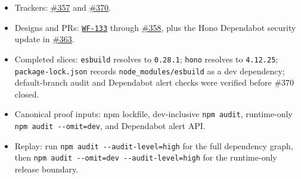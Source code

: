 \begin{itemize}
\tightlist
\item
  Trackers: \href{https://github.com/flyingrobots/bijou/issues/357}{\#357} and \href{https://github.com/flyingrobots/bijou/issues/370}{\#370}.
\item
  Designs and PRs: \href{https://github.com/flyingrobots/bijou/blob/cbd70612140e7a450d764b3c7be1c6af878b99bc/docs/design/WF-133-esbuild-security-patch.md}{\texttt{W\allowbreak{}F\allowbreak{}-\allowbreak{}1\allowbreak{}3\allowbreak{}3}} through \href{https://github.com/flyingrobots/bijou/pull/358}{\#358}, plus the Hono Dependabot security update in \href{https://github.com/flyingrobots/bijou/pull/363}{\#363}.
\item
  Completed slices: \texttt{e\allowbreak{}s\allowbreak{}b\allowbreak{}u\allowbreak{}i\allowbreak{}l\allowbreak{}d} resolves to \texttt{0\allowbreak{}.\allowbreak{}2\allowbreak{}8\allowbreak{}.\allowbreak{}1}; \texttt{h\allowbreak{}o\allowbreak{}n\allowbreak{}o} resolves to \texttt{4\allowbreak{}.\allowbreak{}1\allowbreak{}2\allowbreak{}.\allowbreak{}2\allowbreak{}5}; \texttt{p\allowbreak{}a\allowbreak{}c\allowbreak{}k\allowbreak{}a\allowbreak{}g\allowbreak{}e\allowbreak{}-\allowbreak{}l\allowbreak{}o\allowbreak{}c\allowbreak{}k\allowbreak{}.\allowbreak{}j\allowbreak{}s\allowbreak{}o\allowbreak{}n} records \texttt{n\allowbreak{}o\allowbreak{}d\allowbreak{}e\allowbreak{}\_\allowbreak{}m\allowbreak{}o\allowbreak{}d\allowbreak{}u\allowbreak{}l\allowbreak{}e\allowbreak{}s\allowbreak{}/\allowbreak{}e\allowbreak{}s\allowbreak{}b\allowbreak{}u\allowbreak{}i\allowbreak{}l\allowbreak{}d} as a dev dependency; default-branch audit and Dependabot alert checks were verified before \#370 closed.
\item
  Canonical proof inputs: npm lockfile, dev-inclusive \texttt{n\allowbreak{}p\allowbreak{}m\allowbreak{} \allowbreak{}a\allowbreak{}u\allowbreak{}d\allowbreak{}i\allowbreak{}t}, runtime-only \texttt{n\allowbreak{}p\allowbreak{}m\allowbreak{} \allowbreak{}a\allowbreak{}u\allowbreak{}d\allowbreak{}i\allowbreak{}t\allowbreak{} \allowbreak{}-\allowbreak{}-\allowbreak{}o\allowbreak{}m\allowbreak{}i\allowbreak{}t\allowbreak{}=\allowbreak{}d\allowbreak{}e\allowbreak{}v}, and Dependabot alert API.
\item
  Replay: run \texttt{n\allowbreak{}p\allowbreak{}m\allowbreak{} \allowbreak{}a\allowbreak{}u\allowbreak{}d\allowbreak{}i\allowbreak{}t\allowbreak{} \allowbreak{}-\allowbreak{}-\allowbreak{}a\allowbreak{}u\allowbreak{}d\allowbreak{}i\allowbreak{}t\allowbreak{}-\allowbreak{}l\allowbreak{}e\allowbreak{}v\allowbreak{}e\allowbreak{}l\allowbreak{}=\allowbreak{}h\allowbreak{}i\allowbreak{}g\allowbreak{}h} for the full dependency graph, then \texttt{n\allowbreak{}p\allowbreak{}m\allowbreak{} \allowbreak{}a\allowbreak{}u\allowbreak{}d\allowbreak{}i\allowbreak{}t\allowbreak{} \allowbreak{}-\allowbreak{}-\allowbreak{}o\allowbreak{}m\allowbreak{}i\allowbreak{}t\allowbreak{}=\allowbreak{}d\allowbreak{}e\allowbreak{}v\allowbreak{} \allowbreak{}-\allowbreak{}-\allowbreak{}a\allowbreak{}u\allowbreak{}d\allowbreak{}i\allowbreak{}t\allowbreak{}-\allowbreak{}l\allowbreak{}e\allowbreak{}v\allowbreak{}e\allowbreak{}l\allowbreak{}=\allowbreak{}h\allowbreak{}i\allowbreak{}g\allowbreak{}h} for the runtime-only release boundary.

\end{itemize}
